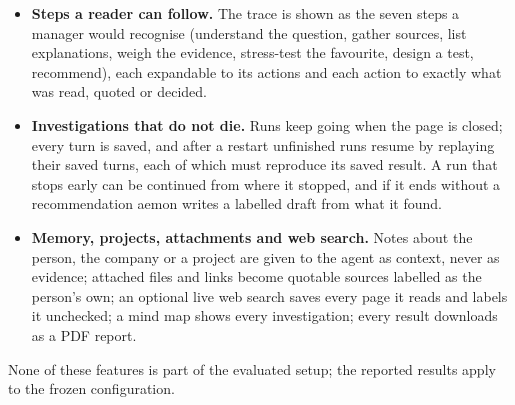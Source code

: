 \begin{itemize}
        or links instead.
  \item \textbf{Steps a reader can follow.} The trace is shown as the seven steps a manager would recognise (understand
        the question, gather sources, list explanations, weigh the evidence, stress-test the favourite, design a test,
        recommend), each expandable to its actions and each action to exactly what was read, quoted or decided.
  \item \textbf{Investigations that do not die.} Runs keep going when the page is closed; every turn is saved, and
        after a restart unfinished runs resume by replaying their saved turns, each of which must reproduce its saved
        result. A run that stops early can be continued from where it stopped, and if it ends without a recommendation
        aemon writes a labelled draft from what it found.
  \item \textbf{Memory, projects, attachments and web search.} Notes about the person, the company or a project are
        given to the agent as context, never as evidence; attached files and links become quotable sources labelled as
        the person's own; an optional live web search saves every page it reads and labels it unchecked; a mind map
        shows every investigation; every result downloads as a PDF report.
\end{itemize}
None of these features is part of the evaluated setup; the reported results apply to the frozen configuration.

